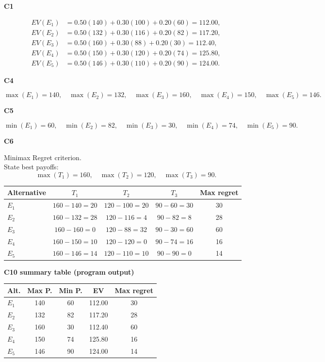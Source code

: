 \begin{ExamProblems}
		\vspace{0.25cm}
		
		\textbf{C1}\par
				\[
		\begin{aligned}
			EV(E_1)&=0.50(140)+0.30(100)+0.20(60)=112.00,\\
			EV(E_2)&=0.50(132)+0.30(116)+0.20(82)=117.20,\\
			EV(E_3)&=0.50(160)+0.30(88)+0.20(30)=112.40,\\
			EV(E_4)&=0.50(150)+0.30(120)+0.20(74)=125.80,\\
			EV(E_5)&=0.50(146)+0.30(110)+0.20(90)=124.00.
		\end{aligned}
		\]
		

		\textbf{C4}\par
				\[
		\max(E_1)=140,\quad \max(E_2)=132,\quad \max(E_3)=160,\quad \max(E_4)=150,\quad \max(E_5)=146.
		\]
		

		\textbf{C5}\par
				\[
		\min(E_1)=60,\quad \min(E_2)=82,\quad \min(E_3)=30,\quad \min(E_4)=74,\quad \min(E_5)=90.
		\]
		


		\textbf{C6}\par
		Minimax Regret criterion.\\
				State best payoffs:
		\[
		\max(T_1)=160,\quad \max(T_2)=120,\quad \max(T_3)=90.
		\]
		\begin{center}
			\begin{tabular}{l c c c c}
				\toprule
				Alternative & $T_1$ & $T_2$ & $T_3$ & Max regret \\
				\midrule
				$E_1$ & $160-140=20$ & $120-100=20$ & $90-60=30$ & 30 \\
				$E_2$ & $160-132=28$ & $120-116=4$ & $90-82=8$ & 28 \\
				$E_3$ & $160-160=0$ & $120-88=32$ & $90-30=60$ & 60 \\
				$E_4$ & $160-150=10$ & $120-120=0$ & $90-74=16$ & 16 \\
				$E_5$ & $160-146=14$ & $120-110=10$ & $90-90=0$ & 14 \\
				\bottomrule
			\end{tabular}
		\end{center}
		

		\textbf{C10 summary table (program output)}\par
		\begin{center}
			\begin{tabular}{l c c c c}
				\hline
				Alt. & Max P. & Min P. & EV & Max regret \\
				\hline
				$E_1$ & 140 & 60 & 112.00 & 30 \\
				$E_2$ & 132 & 82 & 117.20 & 28 \\
				$E_3$ & 160 & 30 & 112.40 & 60 \\
				$E_4$ & 150 & 74 & 125.80 & 16 \\
				$E_5$ & 146 & 90 & 124.00 & 14 \\
				\hline
			\end{tabular}
		\end{center}
		

\end{ExamProblems}
